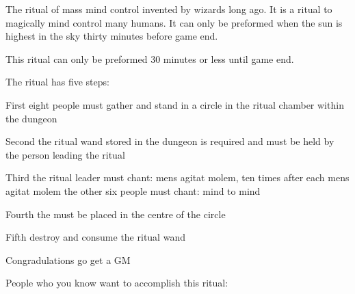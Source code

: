 \documentclass[green]{guildcamp2}
\begin{document}
\name{\gEnslaveRitual{}}
The ritual of mass mind control invented by wizards long ago. It is a ritual to magically mind control many humans. It can only be preformed when the sun is highest in the sky thirty minutes before game end. 

This ritual can only be preformed 30 minutes or less until game end.

The ritual has five steps: 

First eight people must gather and stand in a circle in the ritual chamber within the dungeon

Second the ritual wand stored in the dungeon is required and must be held by the person leading the ritual

Third the ritual leader must chant: mens agitat molem, ten times after each mens agitat molem the other six people must chant: mind to mind

Fourth the \iDominationIdol{} must be placed in the centre of the circle 

Fifth destroy and consume the ritual wand

Congradulations go get a GM

People who you know want to accomplish this ritual:
\cVampire{}
\cBasilisk{}
\cMinotaur{}
\end{document}
